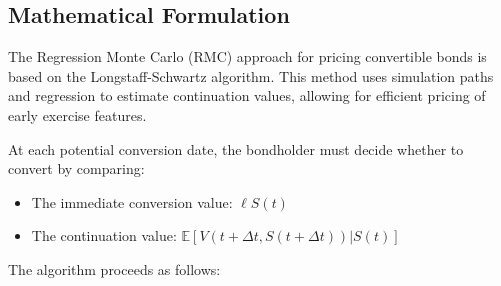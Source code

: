 \subsection{Mathematical Formulation}

The Regression Monte Carlo (RMC) approach for pricing convertible bonds is based on the Longstaff-Schwartz algorithm. This method uses simulation paths and regression to estimate continuation values, allowing for efficient pricing of early exercise features.

At each potential conversion date, the bondholder must decide whether to convert by comparing:
\begin{itemize}
    \item The immediate conversion value: $\ell S(t)$
    \item The continuation value: $\mathbb{E}[V(t+\Delta t, S(t+\Delta t)) | S(t)]$
\end{itemize}

The algorithm proceeds as follows:

